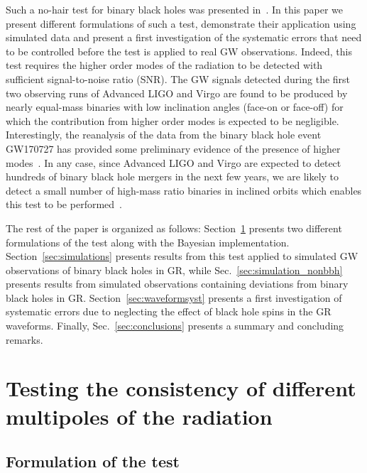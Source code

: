 \documentclass[prd,preprintnumbers,twocolumn,eqsecnum,floatfix,a4paper,nofootinbib,superscriptaddress]{revtex4}
\begin{document}
Such a no-hair test for binary black holes was presented in~\cite{Dhanpal:2018ufk}. In this paper we present different formulations of such a test, demonstrate their application using simulated data and present a first investigation of the systematic errors that need to be controlled before the test is applied to real GW observations. Indeed, this test requires the higher order modes of the radiation to be detected with sufficient signal-to-noise ratio (SNR). The GW signals detected during the first two observing runs of Advanced LIGO and Virgo are found to be produced by nearly equal-mass binaries with low inclination angles (face-on or face-off) for which the contribution from higher order modes is expected to be negligible. Interestingly, the reanalysis of the data from the binary black hole event GW170727 has provided some preliminary evidence of the presence of higher modes~\cite{Chatziioannou:2019dsz}. In any case, since Advanced LIGO and Virgo are expected to detect hundreds of binary black hole mergers in the next few years, we are likely to detect a small number of high-mass ratio binaries in inclined orbits which enables this test to be performed~\cite{Dhanpal:2018ufk}. 

The rest of the paper is organized as follows: Section~\ref{sec:test} presents two different formulations of the test along with the Bayesian implementation. Section~\ref{sec:simulations} presents results from this test applied to simulated GW observations of binary black holes in GR, while Sec.~\ref{sec:simulation_nonbbh} presents results from simulated observations containing deviations from binary black holes in GR. Section~\ref{sec:waveformsyst} presents a first investigation of systematic errors due to neglecting the effect of black hole spins in the GR waveforms. Finally, Sec.~\ref{sec:conclusions} presents a summary and concluding remarks. 

\section{Testing the consistency of different multipoles of the radiation}
\label{sec:test}

\subsection{Formulation of the test}
\end{document}
